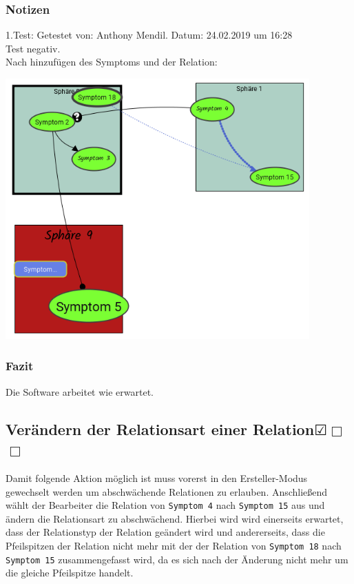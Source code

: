 \documentclass{scrartcl}
\newcommand{\subsectiont}[2]{\subsection[#1]{#1{\normalsize\normalfont #2}}}
\newcommand{\leer}{$\Box$}
\newcommand{\ok}{$\CheckedBox$}
\begin{document}
\subsubsection{Notizen}
1.Test: Getestet von: Anthony Mendil. Datum: 24.02.2019 um 16:28 \\
Test negativ. \\
Nach hinzufügen des Symptoms und der Relation: 
\begin{center}
\includegraphics[height=10cm]{3_35.PNG}
\end{center}
\subsubsection{Fazit}
Die Software arbeitet wie erwartet.

\subsectiont{Verändern der Relationsart einer Relation}{\dotfill\ok\leer\leer}
Damit folgende Aktion möglich ist muss vorerst in den Ersteller-Modus gewechselt werden um abschwächende Relationen zu erlauben. Anschließend wählt der Bearbeiter die Relation von \texttt{Symptom 4} nach \texttt{Symptom 15} aus und ändern die Relationsart zu abschwächend. Hierbei wird wird einerseits erwartet, dass der Relationstyp der Relation geändert wird und andererseits, dass die Pfeilspitzen der Relation nicht mehr mit der der Relation von \texttt{Symptom 18} nach \texttt{Symptom 15} zusammengefasst wird, da es sich nach der Änderung nicht mehr um die gleiche Pfeilspitze handelt.
\end{document}
